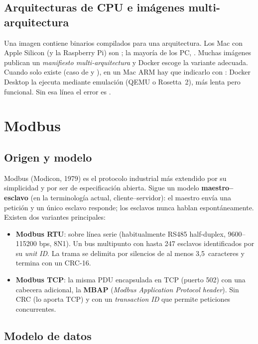 \subsection{Arquitecturas de CPU e imágenes multi-arquitectura}

Una imagen contiene binarios compilados para una arquitectura. Los Mac con Apple Silicon (y la Raspberry Pi) son ; la mayoría de los PC, . Muchas imágenes publican un \emph{manifiesto multi-arquitectura} y Docker escoge la variante adecuada. Cuando solo existe  (caso de  y ), en un Mac ARM hay que indicarlo con : Docker Desktop la ejecuta mediante emulación (QEMU o Rosetta~2), más lenta pero funcional. Sin esa línea el error es .

\section{Modbus}
\label{sec:modbus}

\subsection{Origen y modelo}

Modbus (Modicon, 1979) es el protocolo industrial más extendido por su simplicidad y por ser de especificación abierta. Sigue un modelo \textbf{maestro--esclavo} (en la terminología actual, cliente--servidor): el maestro envía una petición y un único esclavo responde; los esclavos nunca hablan espontáneamente. Existen dos variantes principales:

\begin{itemize}
  \item \textbf{Modbus RTU}: sobre línea serie (habitualmente RS485 half-duplex, 9600--115200 bps, 8N1). Un bus multipunto con hasta 247 esclavos identificados por su \emph{unit ID}. La trama se delimita por silencios de al menos 3,5~caracteres y termina con un CRC-16.
  \item \textbf{Modbus TCP}: la misma PDU encapsulada en TCP (puerto 502) con una cabecera adicional, la \textbf{MBAP} (\emph{Modbus Application Protocol header}). Sin CRC (lo aporta TCP) y con un \emph{transaction ID} que permite peticiones concurrentes.
\end{itemize}

\subsection{Modelo de datos}

